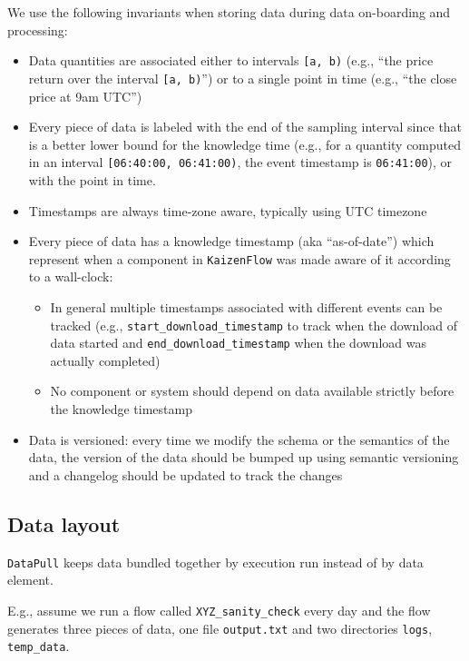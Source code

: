 \documentclass[11pt, reqno]{amsart}
\theoremstyle{definition}
\theoremstyle{remark}
\begin{document}
We use the following invariants when storing data during data on-boarding and
processing:

\begin{itemize}
  \item Data quantities are associated either to intervals \verb|[a, b)|
        (e.g., ``the price return over the interval \verb|[a, b)|'')
        or to a single point in time (e.g., ``the close price at 9am UTC'')
  \item Every piece of data is labeled with the end of the sampling interval
        since that is a better lower bound for the knowledge time
        (e.g., for a quantity computed in an interval
        \verb|[06:40:00, 06:41:00)|, the event timestamp is \verb|06:41:00|),
        or with the point in time.
  \item Timestamps are always time-zone aware, typically using UTC timezone
  \item Every piece of data has a knowledge timestamp (aka ``as-of-date'')
        which represent when a component in \verb|KaizenFlow| was made aware of it
        according to a wall-clock:
        \begin{itemize}
          \item In general multiple timestamps associated with different events
                can be tracked (e.g., \verb|start_download_timestamp| to track
                when the download of data started and \verb|end_download_timestamp|
                when the download was actually completed)
          \item No component or system should depend on data available strictly
                before the knowledge timestamp
        \end{itemize}
  \item Data is versioned: every time we modify the schema or the semantics of
        the data, the version of the data should be bumped up using semantic
        versioning and a changelog should be updated to track the changes
\end{itemize}

\subsection{Data layout}

\verb|DataPull| keeps data bundled together by execution run instead of by data
element.

E.g., assume we run a flow called \verb|XYZ_sanity_check| every day
and the flow generates three pieces of data, one file \verb|output.txt| and two
directories \verb|logs|, \verb|temp_data|.
\end{document}
